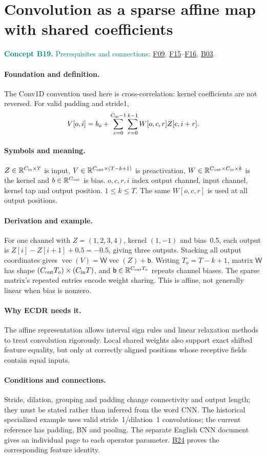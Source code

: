 \documentclass[11pt,a4paper]{article}
\newcommand{\R}{\mathbb R}
\newcommand{\conceptid}{Front matter}
\newcommand{\concept}[3]{\clearpage\renewcommand{\conceptid}{#1}%
\section{#2}\label{concept:#1}%
\textcolor{teal}{\textbf{Concept #1.} Prerequisites and connections: #3.}\par
\typeout{ECDR-CONCEPT-START #1 PAGE=\thepage}}
\begin{document}
\concept{B19}{Convolution as a sparse affine map with shared coefficients}{\hyperref[concept:F09]{F09}, \hyperref[concept:F15]{F15}--\hyperref[concept:F16]{F16}, \hyperref[concept:B03]{B03}}
\paragraph{Foundation and definition.}
The Conv1D convention used here is cross-correlation: kernel coefficients
are not reversed. For valid padding and stride1,
\[
 V[o,i]=b_o+\sum_{c=0}^{C_{\rm in}-1}\sum_{r=0}^{k-1}
 W[o,c,r]Z[c,i+r].
\]
\paragraph{Symbols and meaning.}
$Z\in\R^{C_{\rm in}\times T}$ is input, $V\in\R^{C_{\rm out}\times(T-k+1)}$
is preactivation, $W\in\R^{C_{\rm out}\times C_{\rm in}\times k}$ is
the kernel and $b\in\R^{C_{\rm out}}$ is bias. $o,c,r,i$ index output
channel, input channel, kernel tap and output position. $1\le k\le T$.
The same $W[o,c,r]$ is used at all output positions.
\paragraph{Derivation and example.}
For one channel with $Z=(1,2,3,4)$, kernel $(1,-1)$ and bias~0.5,
each output is $Z[i]-Z[i+1]+0.5=-0.5$, giving three outputs. Stacking
all output coordinates gives $\operatorname{vec}(V)=\mathsf W\operatorname{vec}(Z)+\mathsf b$.
Writing $T_o=T-k+1$, matrix $\mathsf W$ has shape
$(C_{\rm out}T_o)\times(C_{\rm in}T)$, and $\mathsf b\in\R^{C_{\rm out}T_o}$
repeats channel biases. The sparse matrix's repeated entries encode weight
sharing. This is affine, not generally linear when bias is nonzero.
\paragraph{Why ECDR needs it.}
The affine representation allows interval sign rules and linear
relaxation methods to treat convolution rigorously. Local shared weights
also support exact shifted feature equality, but only at correctly aligned
positions whose receptive fields contain equal inputs.
\paragraph{Conditions and connections.}
Stride, dilation, grouping and padding change connectivity and output
length; they must be stated rather than inferred from the word CNN.
The historical specialized example uses valid stride~1/dilation~1 convolutions; the current reference has padding, BN and pooling.
The separate English CNN document gives an individual page to each
operator parameter. \hyperref[concept:B24]{B24} proves the corresponding feature identity.
\par\label{endconcept:B19}
\end{document}
